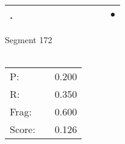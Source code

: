 \documentclass[landscape]{article}
\newcommand{\ssp}{\hspace{2pt}}
\newcommand{\mex}{\cellcolor{g}$\bullet$}
\begin{document}
\begin{tabular}{|l|p{10pt}|p{10pt}|p{10pt}|p{10pt}|p{10pt}|p{10pt}|p{10pt}|p{10pt}|p{10pt}|p{10pt}|}
\hline
\ssp \cellcolor{ref9}. \ssp&\hspace{2pt}&\hspace{2pt}&\hspace{2pt}&\hspace{2pt}&\hspace{2pt}&\hspace{2pt}&\hspace{2pt}&\hspace{2pt}&\hspace{2pt}&\hspace{2pt}\mex\\
\hline
\end{tabular}

\vspace{6pt}
\noindent Segment 172\\\\
\noindent\begin{tabular}{lm{12pt}r}
\hline
P:&&0.200\\
R:&&0.350\\
Frag:&&0.600\\
Score:&&0.126\\
\end{tabular}

\newpage
\end{document}
